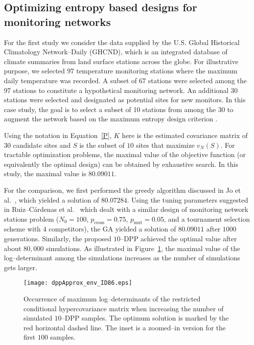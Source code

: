 \documentclass[]{interact}
\theoremstyle{plain}%
\theoremstyle{definition}
\theoremstyle{remark}
\begin{document}
\subsection{Optimizing entropy based designs for monitoring networks}
For the first study we consider the data supplied by the U.S. Global Historical Climatology Network--Daily (GHCND), which is an integrated database of climate summaries from land surface stations across the globe. For illustrative purpose, we selected $97$ temperature monitoring stations where the maximum daily temperature was recorded. A subset of 67 stations were selected among the 97 stations to constitute a hypothetical monitoring network. An additional 30 stations were selected and designated as potential sites for new monitors. In this case study, the goal is to select a subset of 10 stations from among the 30 to augment the network based on the maximum entropy design criterion \cite{CaseltonZidek}. 

Using the notation in Equation~\eqref{P}, $K$ here is the estimated covariance matrix of $30$ candidate sites and $S$ is the subset of $10$ sites that maximize $v_N(S)$. For tractable optimization problems, the maximal value of the objective function (or equivalently the optimal design) can be obtained by exhaustive search. In this study, the maximal value is $80.09011$.

For the comparison, we first performed the greedy algorithm discussed in Jo et al.~\cite{KO1995}, which yielded a solution of $80.07284$. Using the tuning parameters suggested in Ruiz--C\'{a}rdenas et al.~\cite{Schmidt} which dealt with a similar design of monitoring network stations problem ($N_0 = 100$, $p_{\text{cross}} = 0.75$, $p_{\text{mut}} = 0.05$, and a tournament selection scheme with $4$ competitors), the GA yielded a solution of $80.09011$ after $1000$ generations. Similarly, the proposed $10$--DPP achieved the optimal value after about $80,000$ simulations. As illustrated in Figure~\ref{fig:dppreal}, the maximal value of the log--determinant among the simulations increases as the number of simulations gets larger.  

\begin{figure}
    \centering
	\texttt{[image: dppApprox\_env\_ID86.eps]}
	\caption{Occurrence of maximum log--determinants of the restricted conditional hypercovariance matrix when increasing the number of simulated $10$--DPP samples. The optimum solution is marked by the red horizontal dashed line. The inset is a zoomed--in version for the first $100$ samples.}
    \label{fig:dppreal}
\end{figure}
\end{document}
